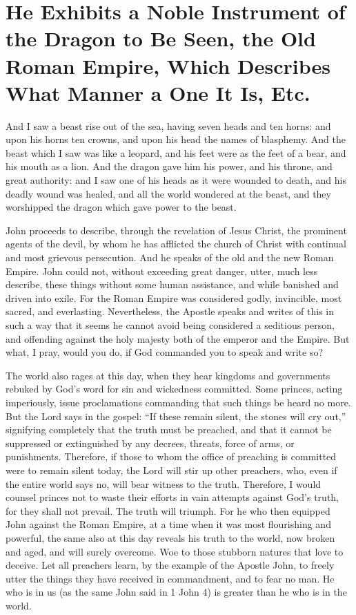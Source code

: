 \chapter[Sermon 55. He Exhibits a Noble Instrument of the Dragon to Be Seen, the Old Roman Empire, Which Describes What Manner a One It Is, Etc.]{He Exhibits a Noble Instrument of the Dragon to Be Seen, the Old Roman Empire, Which Describes What Manner a One It Is, Etc.}
\label{sermon:055}

And I saw a beast rise out of the sea, having seven heads and ten horns: and upon his horns ten crowns, and upon his head the names of blasphemy. And the beast which I saw was like a leopard, and his feet were as the feet of a bear, and his mouth as a lion. And the dragon gave him his power, and his throne, and great authority: and I saw one of his heads as it were wounded to death, and his deadly wound was healed, and all the world wondered at the beast, and they worshipped the dragon which gave power to the beast.

John proceeds to describe, through the revelation of Jesus Christ, the prominent agents of the devil, by whom he has afflicted the church of Christ with continual and most grievous persecution. And he speaks of the old and the new Roman Empire. John could not, without exceeding great danger, utter, much less describe, these things without some human assistance, and while banished and driven into exile. For the Roman Empire was considered godly, invincible, most sacred, and everlasting. Nevertheless, the Apostle speaks and writes of this in such a way that it seems he cannot avoid being considered a seditious person, and offending against the holy majesty both of the emperor and the Empire. But what, I pray, would you do, if God commanded you to speak and write so?

The world also rages at this day, when they hear kingdoms and governments rebuked by God’s word for sin and wickedness committed. Some princes, acting imperiously, issue proclamations commanding that such things be heard no more. But the Lord says in the gospel: “If these remain silent, the stones will cry out,” signifying completely that the truth must be preached, and that it cannot be suppressed or extinguished by any decrees, threats, force of arms, or punishments. Therefore, if those to whom the office of preaching is committed were to remain silent today, the Lord will stir up other preachers, who, even if the entire world says no, will bear witness to the truth. Therefore, I would counsel princes not to waste their efforts in vain attempts against God’s truth, for they shall not prevail. The truth will triumph. For he who then equipped John against the Roman Empire, at a time when it was most flourishing and powerful, the same also at this day reveals his truth to the world, now broken and aged, and will surely overcome. Woe to those stubborn natures that love to deceive. Let all preachers learn, by the example of the Apostle John, to freely utter the things they have received in commandment, and to fear no man. He who is in us (as the same John said in 1 John 4) is greater than he who is in the world.

